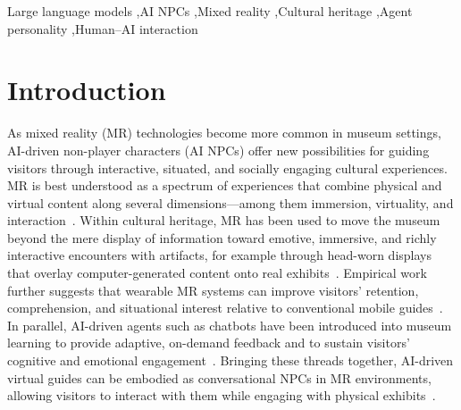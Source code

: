 \documentclass[a4paper,fleqn]{cas-sc}
\begin{document}
\begin{keywords}
Large language models \sep AI NPCs \sep Mixed reality \sep Cultural heritage \sep Agent personality \sep Human--AI interaction
\end{keywords}

\maketitle

\section{Introduction}\label{sec:introduction}

As mixed reality (MR) technologies become more common in museum settings, AI-driven non-player characters (AI NPCs) offer new possibilities for guiding visitors through interactive, situated, and socially engaging cultural experiences. MR is best understood as a spectrum of experiences that combine physical and virtual content along several dimensions—among them immersion, virtuality, and interaction~\citep{speicherWhatMixedReality2019}. Within cultural heritage, MR has been used to move the museum beyond the mere display of information toward emotive, immersive, and richly interactive encounters with artifacts, for example through head-worn displays that overlay computer-generated content onto real exhibits~\citep{hammadyFrameworkConstructingEvaluating2021, marti-testonMethodologyProduceAugmentedReality2021}. Empirical work further suggests that wearable MR systems can improve visitors' retention, comprehension, and situational interest relative to conventional mobile guides~\citep{chinApplyingWearableMRbased2024}. In parallel, AI-driven agents such as chatbots have been introduced into museum learning to provide adaptive, on-demand feedback and to sustain visitors' cognitive and emotional engagement~\citep{liangEffectAIbasedChatbot2024}. Bringing these threads together, AI-driven virtual guides can be embodied as conversational NPCs in MR environments, allowing visitors to interact with them while engaging with physical exhibits~\citep{hammadyFrameworkConstructingEvaluating2021, yuIntegratingMixedReality}.
\end{document}
